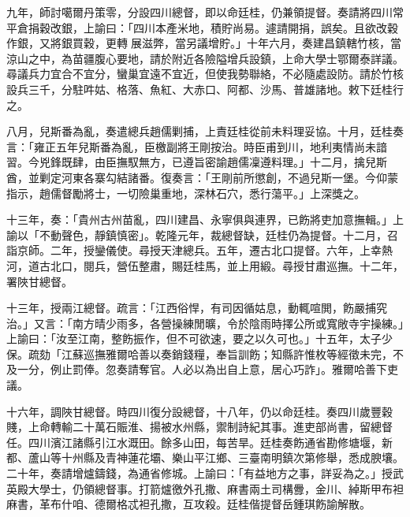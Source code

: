 \begin{pinyinscope}
九年，師討噶爾丹策零，分設四川總督，即以命廷桂，仍兼領提督。奏請將四川常平倉捐穀改銀，上諭曰：「四川本產米地，積貯尚易。遽請開捐，誤矣。且欲改穀作銀，又將銀買穀，更轉展滋弊，當另議增貯。」十年六月，奏建昌鎮轄竹核，當涼山之中，為苗疆腹心要地，請於附近各險隘增兵設鎮，上命大學士鄂爾泰詳議。尋議兵力宜合不宜分，蠻巢宜遠不宜近，但使我勢聯絡，不必隨處設防。請於竹核設兵三千，分駐吽姑、格落、魚紅、大赤口、阿都、沙馬、普雄諸地。敕下廷桂行之。

八月，兒斯番為亂，奏遣總兵趙儒剿捕，上責廷桂從前未料理妥協。十月，廷桂奏言：「雍正五年兒斯番為亂，臣檄副將王剛按治。時臣甫到川，地利夷情尚未諳習。今兇鋒既肆，由臣撫馭無方，已遵旨密諭趙儒凜遵料理。」十二月，擒兒斯酋，並剿定河東各寨勾結諸番。復奏言：「王剛前所懲創，不過兒斯一堡。今仰蒙指示，趙儒督勵將士，一切險巢重地，深林石穴，悉行蕩平。」上深獎之。

十三年，奏：「貴州古州苗亂，四川建昌、永寧俱與連界，已飭將吏加意撫輯。」上諭以「不動聲色，靜鎮慎密」。乾隆元年，裁總督缺，廷桂仍為提督。十二月，召詣京師。二年，授鑾儀使。尋授天津總兵。五年，遷古北口提督。六年，上幸熱河，道古北口，閱兵，營伍整肅，賜廷桂馬，並上用緞。尋授甘肅巡撫。十二年，署陜甘總督。

十三年，授兩江總督。疏言：「江西俗悍，有司因循姑息，動輒喧閧，飭嚴捕究治。」又言：「南方晴少雨多，各營操練閒曠，令於陰雨時擇公所或寬敞寺宇操練。」上諭曰：「汝至江南，整飭振作，但不可欲速，要之以久可也。」十五年，太子少保。疏劾「江蘇巡撫雅爾哈善以奏銷錢糧，奉旨訓飭；知縣許惟枚等經徵未完，不及一分，例止罰俸。忽奏請奪官。人必以為出自上意，居心巧詐」。雅爾哈善下吏議。

十六年，調陜甘總督。時四川復分設總督，十八年，仍以命廷桂。奏四川歲豐穀賤，上命轉輸二十萬石賑淮、揚被水州縣，禦制詩紀其事。進吏部尚書，留總督任。四川濱江諸縣引江水溉田。餘多山田，每苦旱。廷桂奏飭通省勘修塘堰，新都、蘆山等十州縣及青神蓮花壩、樂山平江鄉、三臺南明鎮次第修舉，悉成腴壤。二十年，奏請增爐鑄錢，為通省修城。上諭曰：「有益地方之事，詳妥為之。」授武英殿大學士，仍領總督事。打箭爐徼外孔撒、麻書兩土司構釁，金川、綽斯甲布袒麻書，革布什咱、德爾格忒袒孔撒，互攻殺。廷桂偕提督岳鍾琪飭諭解散。


\end{pinyinscope}
